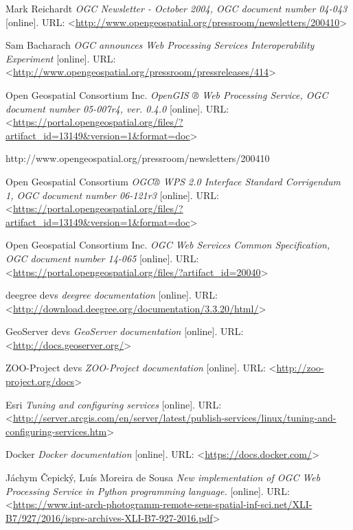 \documentclass[12pt,a4paper]{article}
\begin{document}
\newpage
\begin{thebibliography}{99}
\label{Bibliography}
Mark Reichardt \textit{OGC Newsletter - October 2004, OGC document number 04-043} [online].
URL: \textless\url{http://www.opengeospatial.org/pressroom/newsletters/200410}\textgreater

Sam Bacharach \textit{OGC announces Web Processing Services Interoperability Experiment} [online].
URL: \textless\url{http://www.opengeospatial.org/pressroom/pressreleases/414}\textgreater

Open Geospatial Consortium Inc. \textit{OpenGIS ® Web Processing Service, OGC document number 05-007r4, ver. 0.4.0} [online].
URL: \textless\url{https://portal.opengeospatial.org/files/?artifact_id=13149&version=1&format=doc}\textgreater

http://www.opengeospatial.org/pressroom/newsletters/200410

Open Geospatial Consortium \textit{OGC® WPS 2.0 Interface Standard Corrigendum 1, OGC document number 06-121r3} [online].
URL: \textless\url{https://portal.opengeospatial.org/files/?artifact_id=13149&version=1&format=doc}\textgreater

Open Geospatial Consortium Inc. \textit{OGC Web Services Common Specification, OGC document number 14-065} [online].
URL: \textless\url{https://portal.opengeospatial.org/files/?artifact_id=20040}\textgreater

deegree devs \textit{deegree documentation} [online].
URL: \textless\url{http://download.deegree.org/documentation/3.3.20/html/}\textgreater

GeoServer devs \textit{GeoServer documentation} [online].
URL: \textless\url{http://docs.geoserver.org/}\textgreater

ZOO-Project devs \textit{ZOO-Project documentation} [online].
URL: \textless\url{http://zoo-project.org/docs}\textgreater

Esri \textit{Tuning and configuring services} [online].
URL: \textless\url{http://server.arcgis.com/en/server/latest/publish-services/linux/tuning-and-configuring-services.htm}\textgreater

Docker \textit{Docker documentation} [online].
URL: \textless\url{https://docs.docker.com/}\textgreater

Jáchym Čepický, Luís Moreira de Sousa \textit{New implementation of OGC Web Processing Service in Python programming language.} [online].
URL: \textless\url{https://www.int-arch-photogramm-remote-sens-spatial-inf-sci.net/XLI-B7/927/2016/isprs-archives-XLI-B7-927-2016.pdf}\textgreater


\end{thebibliography}
\end{document}
